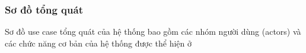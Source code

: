 \subsubsection{Sơ đồ tổng quát}
Sơ đồ use case tổng quát của hệ thống bao gồm các nhóm người dùng (actors)
và các chức năng cơ bản của hệ thống được thể hiện ở 

%   
